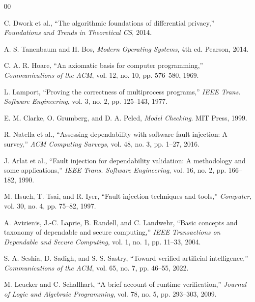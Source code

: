\documentclass[conference]{IEEEtran}
\begin{document}
\begin{thebibliography}{00}

 C. Dwork et al., ``The algorithmic foundations of differential privacy,'' \textit{Foundations and Trends in Theoretical CS}, 2014.


 A. S. Tanenbaum and H. Bos, \textit{Modern Operating Systems}, 4th ed. Pearson, 2014.

 C. A. R. Hoare, ``An axiomatic basis for computer programming,'' \textit{Communications of the ACM}, vol. 12, no. 10, pp. 576--580, 1969.

 L. Lamport, ``Proving the correctness of multiprocess programs,'' \textit{IEEE Trans. Software Engineering}, vol. 3, no. 2, pp. 125--143, 1977.


 E. M. Clarke, O. Grumberg, and D. A. Peled, \textit{Model Checking}. MIT Press, 1999.

 R. Natella et al., ``Assessing dependability with software fault injection: A survey,'' \textit{ACM Computing Surveys}, vol. 48, no. 3, pp. 1--27, 2016.

 J. Arlat et al., ``Fault injection for dependability validation: A methodology and some applications,'' \textit{IEEE Trans. Software Engineering}, vol. 16, no. 2, pp. 166--182, 1990.

 M. Hsueh, T. Tsai, and R. Iyer, ``Fault injection techniques and tools,'' \textit{Computer}, vol. 30, no. 4, pp. 75--82, 1997.


 A. Avizienis, J.-C. Laprie, B. Randell, and C. Landwehr, ``Basic concepts and taxonomy of dependable and secure computing,'' \textit{IEEE Transactions on Dependable and Secure Computing}, vol. 1, no. 1, pp. 11--33, 2004.

 S. A. Seshia, D. Sadigh, and S. S. Sastry, ``Toward verified artificial intelligence,'' \textit{Communications of the ACM}, vol. 65, no. 7, pp. 46--55, 2022.

 M. Leucker and C. Schallhart, ``A brief account of runtime verification,'' \textit{Journal of Logic and Algebraic Programming}, vol. 78, no. 5, pp. 293--303, 2009.



\end{thebibliography}
\end{document}
